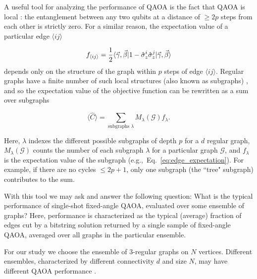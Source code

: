 
A useful tool for analyzing the performance of QAOA is  the fact that QAOA is local \cite{farhi2014quantum,farhi2020quantum}: the entanglement between any two qubits at a distance of $\geq2p$ steps from each other is strictly zero. For a similar reason, the expectation value of a particular edge $\langle ij\rangle$

\begin{equation}\label{eq:edge_expectation}
    f_{\langle ij\rangle} = \frac{1}{2}\langle {\vec{\gamma}, \vec{\beta}}|1 - \hat \sigma_z^i\hat\sigma_z^j|{\vec{\gamma}, \vec{\beta}} \rangle
\end{equation}
depends only on the structure of the graph within $p$ steps of edge $\langle ij\rangle$. Regular graphs have a finite number of such local structures (also known as subgraphs) \cite{Wurtz_guarantee}, and so the expectation value of the objective function can be rewritten as a sum over subgraphs

\begin{equation}
    \langle \hat C\rangle = \sum_{\text{subgraphs } \lambda}M_\lambda(\mathcal G) f_\lambda.
\end{equation}

Here, $\lambda$ indexes the different possible subgraphs of depth $p$ for a $d$ regular graph, $M_\lambda(\mathcal G)$ counts the number of each subgraph $\lambda$ for a particular graph $\mathcal G$, and $f_\lambda$ is the expectation value of the subgraph (e.g.,~Eq.~\eqref{eq:edge_expectation}). For example, if there are no cycles $\leq 2p+1$,  only one subgraph (the ``tree" subgraph)  contributes to the sum.

With this tool we may ask and answer the following question: What is the typical performance of single-shot fixed-angle QAOA, evaluated over some ensemble of graphs? Here, performance is characterized as the typical (average) fraction of edges cut by a bitstring solution returned by a single sample of fixed-angle QAOA, averaged over all graphs in the particular ensemble. 

For our study we choose the ensemble of $3$-regular graphs on $N$ vertices. Different ensembles, characterized by different connectivity $d$ and size $N$, may have different QAOA performance \cite{herrman2021impact, shaydulin2021qaoakit}.

